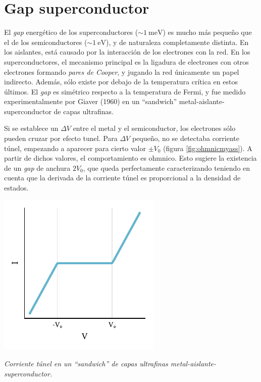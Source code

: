 \documentclass{tufte-book}
\begin{document}
\section{Gap superconductor}
El \textit{gap} energético de los superconductores ($∼\SI{1}{\milli\eV}$) es
mucho más pequeño que el de los semiconductores ($∼\SI{1}{\eV}$), y de
naturaleza completamente distinta. En los aislantes, está causado por
la interacción de los electrones con la red. En los superconductores,
el mecanismo principal es la ligadura de electrones con otros
electrones formando \emph{pares de Cooper}, y jugando la red
únicamente un papel indirecto. Además, sólo existe por debajo de la
temperatura crítica en estos últimos.
El \textit{gap} es simétrico respecto a la temperatura de Fermi, y fue medido
experimentalmente por Giaver (1960) en un ``sandwich''
metal-aislante-superconductor de capas ultrafinas.

Si se establece un $ΔV$ entre el metal y el semiconductor, los
electrones sólo pueden cruzar por efecto tunel. Para $ΔV$ pequeño, no
se detectaba corriente túnel, empezando a aparecer para cierto valor
$±V_0$ (figura \ref{fig:ohmnicmyass}). A partir de dichos valores, el
comportamiento es ohmnico. Esto sugiere la existencia de un \textit{gap} de
anchura $2V_0$, que
queda perfectamente caracterizando teniendo en cuenta que la derivada
de la corriente túnel es proporcional a la densidad de estados.

\begin{marginfigure}
  \centering
  \includegraphics{figures/ohmnicmyass.pdf}
  \caption{\itshape Corriente túnel en un ``sandwich'' de capas ultrafinas
    metal-aislante-superconductor.}
  \label{fig:ohmnicmyass}
\end{marginfigure}
\end{document}
